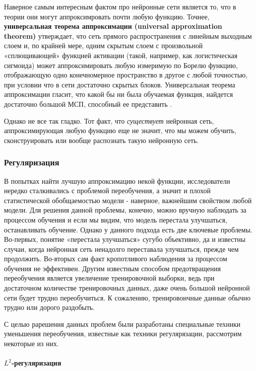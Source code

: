 Наверное самым интересным фактом про нейронные сети является то, что 
в теории они могут аппроксимровать почти любую функцию. Точнее, 
\textbf{универсальная теорема аппроксимации (universal approximation theorem)} 
утверждает, что сеть прямого
распространения с линейным выходным слоем и, по крайней мере, одним скрытым
слоем с произвольной «сплющивающей» функцией активации (такой, например, как
логистическая сигмоида) может аппроксимировать любую измеримую по Борелю
функцию, отображающую одно конечномерное пространство в другое с любой точ­ностью, 
при условии что в сети достаточно скрытых блоков. Универсальная теорема 
аппроксимации гласит, что какой бы ни была обучаемая
функция, найдется достаточно большой МСП, способный ее представить \cite{Goodfellow-et-al-2016}.

Однако не все так гладко. Тот факт, что \textit{существует} нейронная сеть, 
аппроксимирующая любую функцию еще не значит, что мы можем обучить, сконструировать 
или вообще распознать такую нейронную сеть.

\subsubsection{Регуляризация}

В попытках найти лучшую аппроксимацию некой функции, исследователи нередко сталкивались 
с проблемой переобучения, а значит и плохой статистической обобщаемостью модели - 
наверное, важнейшим свойством любой модели. Для решения данной проблемы, конечно, 
можно вручную наблюдать за процессом обучения и если мы видим, что модель перестала 
улучшаться, останавливать обучение. Однако у данного подхода есть две ключевые проблемы. 
Во-первых, понятие «перестала улучшаться» сугубо объективно, да и известны случаи, когда 
нейронная сеть ненадолго переставала улучшаться, прежде чем продолжить. Во-вторых сам 
факт кропотливого наблюдения за процессом обучения не эффективен.
Другим известным способом предотвращения переобучения является увеличение тренировочной 
выборки, ведь при достаточном количестве тренировочных данных, даже очень большой 
нейронной сети будет трудно переобучиться. К сожалению, тренировончные данные обычно 
трудно или дорого раздобыть.

С целью рарешения данных проблем были разработаны специальные техники уменьшения 
переобучения, известные как техники регулярязации, рассмотрим некоторые из них.

\paragraph{$L^2$-регуляризация}

